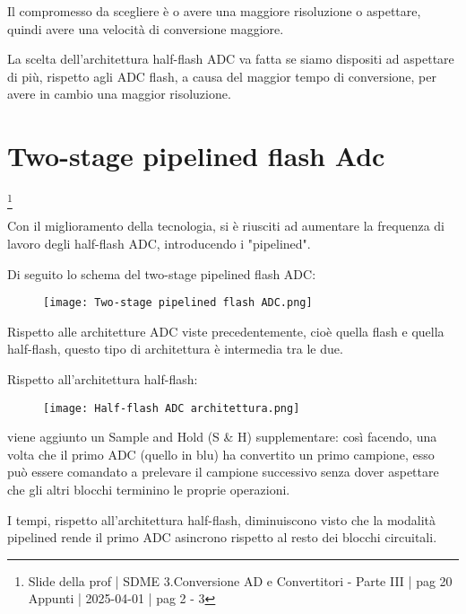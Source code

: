Il compromesso da scegliere è o avere una maggiore risoluzione o aspettare, quindi avere una velocità di conversione maggiore. \newline 

La scelta dell'architettura half-flash ADC va fatta se siamo dispositi ad aspettare di più, rispetto agli ADC flash, a causa del maggior tempo di conversione, per avere in cambio una maggior risoluzione. \newline 

\newpage

\section{Two-stage pipelined flash Adc}
\footnote{Slide della prof | SDME 3.Conversione AD e Convertitori - Parte III | pag 20 \\  
Appunti | 2025-04-01 | pag 2 - 3}

Con il miglioramento della tecnologia, si è riusciti ad aumentare la frequenza di lavoro degli half-flash ADC, 
introducendo i "pipelined". \newline 

Di seguito lo schema del two-stage pipelined flash ADC: 

\begin{figure}[h]
    \centering
    \texttt{[image: Two-stage pipelined flash ADC.png]}
\end{figure}

Rispetto alle architetture ADC viste precedentemente, cioè quella flash e quella half-flash, 
questo tipo di architettura è intermedia tra le due. \newline 

Rispetto all'architettura half-flash: 

\begin{figure}[h]
    \centering
    \texttt{[image: Half-flash ADC architettura.png]}
\end{figure}


viene aggiunto un Sample and Hold (S \& H) supplementare: 
così facendo, una volta che il primo ADC (quello in blu) ha convertito un primo campione, 
esso può essere comandato a prelevare il campione successivo senza dover aspettare che gli altri blocchi terminino le proprie operazioni. \newline 

I tempi, rispetto all'architettura half-flash, diminuiscono visto che la modalità pipelined rende il primo ADC asincrono rispetto al resto dei blocchi circuitali. \newline 

